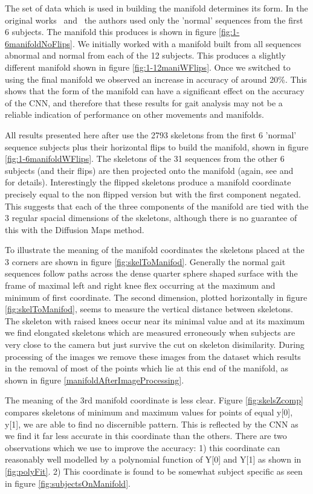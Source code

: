 \documentclass[11pt]{article} %
\begin{document}
The set of data which is used in building the manifold determines its form. In the original works~\cite{Paiement} and~\cite{Tao} the authors used only the 'normal' sequences from the first 6 subjects. The manifold this produces is shown in figure \ref{fig:1-6manifoldNoFlips}. We initially worked with a manifold built from all sequences abnormal and normal from each of the 12 subjects. This produces a slightly different manifold shown in figure \ref{fig:1-12maniWFlips}. Once we switched to using the final manifold we observed an increase in accuracy of around 20\%. This shows that the form of the manifold can have a significant effect on the accuracy of the CNN, and therefore that these results for gait analysis may not be a reliable indication of performance on other movements and manifolds.

All results presented here after use the 2793 skeletons from the first 6 'normal' sequence subjects plus their horizontal flips to build the manifold, shown in figure \ref{fig:1-6manifoldWFlips}. The skeletons of the 31 sequences from the other 6 subjects (and their flips) are then projected onto the manifold (again, see \cite{Paiement} and~\cite{Tao} for details). Interestingly the flipped skeletons produce a manifold coordinate precisely equal to the non flipped version but with the first component negated. This suggests that each of the three components of the manifold are tied with the 3 regular spacial dimensions of the skeletons, although there is no guarantee of this with the Diffusion Maps method. 

To illustrate the meaning of the manifold coordinates the skeletons placed at the 3 corners are shown in figure \ref{fig:skelToManifod}. Generally the normal gait sequences follow paths across the dense quarter sphere shaped surface with the frame of maximal left and right knee flex occurring at the maximum and minimum of first coordinate. The second dimension, plotted horizontally in figure \ref{fig:skelToManifod}, seems to measure the vertical distance between skeletons. The skeleton with raised knees occur near its minimal value and at its maximum we find elongated skeletons which are measured erroneously when subjects are very close to the camera but just survive the cut on skeleton disimilarity. During processing of the images we remove these images from the dataset which results in the removal of most of the points which lie at this end of the manifold, as shown in figure \ref{manifoldAfterImageProcessing}. 

The meaning of the 3rd manifold coordinate is less clear. Figure \ref{fig:skelsZcomp} compares skeletons of minimum and maximum values for points of equal y[0], y[1], we are able to find no discernible pattern. This is reflected by the CNN as we find it far less accurate in this coordinate than the others. There are two observations which we use to improve the accuracy: 1) this coordinate can reasonably well modelled by a polynomial function of Y[0] and Y[1] as shown in \ref{fig:polyFit}. 2) This coordinate is found to be somewhat subject specific as seen in figure \ref{fig:subjectsOnManifold}. 
\end{document}
